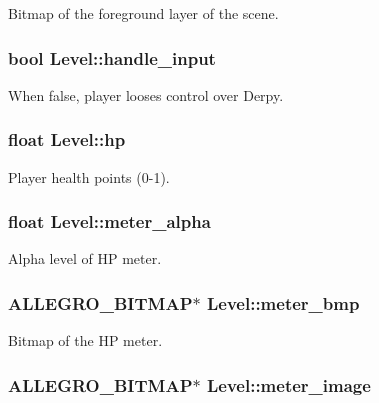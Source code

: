 \-Bitmap of the foreground layer of the scene. \hypertarget{structLevel_a06cf4f2da517284d2006540051d3e5c0}{
\subsubsection[{handle\-\_\-input}]{\setlength{\rightskip}{0pt plus 5cm}bool {\bf \-Level\-::handle\-\_\-input}}}\label{structLevel_a06cf4f2da517284d2006540051d3e5c0}
\-When false, player looses control over \-Derpy. \hypertarget{structLevel_a49df009e8113251cfcb48fe17df0b571}{
\subsubsection[{hp}]{\setlength{\rightskip}{0pt plus 5cm}float {\bf \-Level\-::hp}}}\label{structLevel_a49df009e8113251cfcb48fe17df0b571}
\-Player health points (0-\/1). \hypertarget{structLevel_a246ce1ecf1523db218cf067df15e511f}{
\subsubsection[{meter\-\_\-alpha}]{\setlength{\rightskip}{0pt plus 5cm}float {\bf \-Level\-::meter\-\_\-alpha}}}\label{structLevel_a246ce1ecf1523db218cf067df15e511f}
\-Alpha level of \-H\-P meter. \hypertarget{structLevel_a4e78a54cbf3cdcc804f65acb03cef0b3}{
\subsubsection[{meter\-\_\-bmp}]{\setlength{\rightskip}{0pt plus 5cm}\-A\-L\-L\-E\-G\-R\-O\-\_\-\-B\-I\-T\-M\-A\-P$\ast$ {\bf \-Level\-::meter\-\_\-bmp}}}\label{structLevel_a4e78a54cbf3cdcc804f65acb03cef0b3}
\-Bitmap of the \-H\-P meter. \hypertarget{structLevel_a371c97dfa3d564a19648cb1b72edbf60}{
\subsubsection[{meter\-\_\-image}]{\setlength{\rightskip}{0pt plus 5cm}\-A\-L\-L\-E\-G\-R\-O\-\_\-\-B\-I\-T\-M\-A\-P$\ast$ {\bf \-Level\-::meter\-\_\-image}}}\label{structLevel_a371c97dfa3d564a19648cb1b72edbf60}
